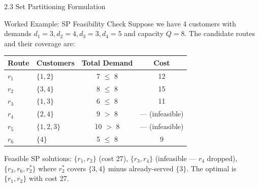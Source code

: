 \documentclass[aspectratio=169,10pt]{beamer}
\begin{document}
\begin{frame}[allowframebreaks]{2.3 Set Partitioning Formulation}
  \framebreak

  \begin{exampleblock}{Worked Example: SP Feasibility Check}
    Suppose we have 4 customers with demands $d_1=3,d_2=4,d_3=3,d_4=5$ and
    capacity $Q=8$. The candidate routes and their coverage are:
    \begin{center}
    \begin{tabular}{llcc}
      \toprule
      Route & Customers & Total Demand & Cost \\
      \midrule
      $r_1$ & $\{1,2\}$   & 7 $\leq$ 8 & 12 \\
      $r_2$ & $\{3,4\}$   & 8 $\leq$ 8 & 15 \\
      $r_3$ & $\{1,3\}$   & 6 $\leq$ 8 & 11 \\
      $r_4$ & $\{2,4\}$   & 9 $>$ 8    & --- (infeasible) \\
      $r_5$ & $\{1,2,3\}$ & 10 $>$ 8   & --- (infeasible) \\
      $r_6$ & $\{4\}$     & 5 $\leq$ 8 & 9  \\
      \bottomrule
    \end{tabular}
    \end{center}
    Feasible SP solutions: $\{r_1, r_2\}$ (cost 27), $\{r_3, r_4\}$
    (infeasible — $r_4$ dropped), $\{r_3, r_6, r_2^*\}$ where $r_2^*$
    covers $\{3,4\}$ minus already-served $\{3\}$. The optimal is
    $\{r_1, r_2\}$ with cost 27.
  \end{exampleblock}
\end{frame}
\end{document}

